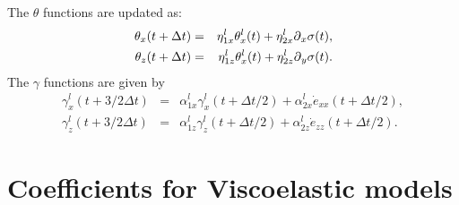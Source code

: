 \documentclass[11pt]{article}
\begin{document}
The $\theta$ functions are updated as:
\begin{eqnarray*}
   \theta_{x}(t+\Delta t)  
                         & = &\eta^l_{1x} \theta^l_{x}(t)
                        + \eta^l_{2x}\mbox{$\partial$}_x{\sigma}(t),\\
   \theta_{z}(t+\Delta t)  
                         & = &\eta^l_{1z} \theta^l_{x}(t)
                        + \eta^l_{2z}\mbox{$\partial$}_y{\sigma}(t).
\end{eqnarray*}
The $\gamma$ functions are given by
\begin{eqnarray*}
\gamma^l_x(t+3/2\Delta t)  & = &\alpha^l_{1x} \gamma^l_x(t+\Delta t/2) 
                        + \alpha^l_{2x}\dot{e}_{xx}(t+\Delta t/2), \\
\gamma^l_z(t+3/2\Delta t)  & = &\alpha^l_{1z} \gamma^l_z(t+\Delta t/2) 
                        + \alpha^l_{2z}\dot{e}_{zz}(t+\Delta t/2). 
\end{eqnarray*}

\section{Coefficients for Viscoelastic models}
\end{document}
